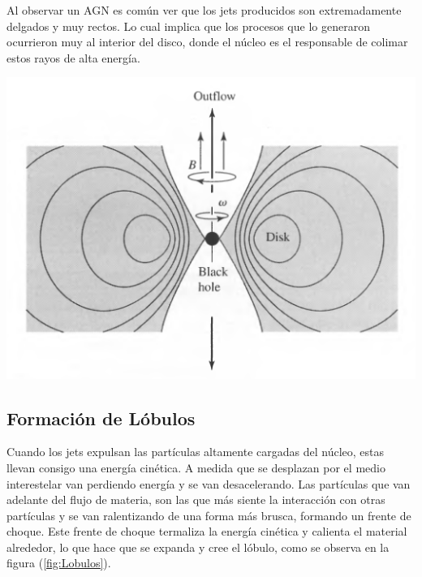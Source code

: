 Al observar un AGN es común ver que los jets producidos son extremadamente delgados y muy rectos. Lo cual implica  que los procesos que lo generaron ocurrieron muy al interior del disco, donde el núcleo es el responsable de colimar estos rayos de alta energía. %
%
\begin{center}
\includegraphics[scale=.5]{./figures/3_AGNs/Jets.png}
\label{fig:Modelo_interior_AGN}
\end{center}

	\subsection{Formación de Lóbulos}
	\label{subsec:Formation_lobules}

Cuando los jets expulsan las partículas altamente cargadas del núcleo, estas llevan consigo una energía cinética. A medida que se desplazan por el medio interestelar van perdiendo energía y se van desacelerando. Las partículas que van adelante del flujo de materia, son las que más siente la interacción con otras partículas y se van ralentizando de una forma más brusca, formando un frente de choque. Este frente de choque termaliza la energía cinética y calienta el material alrededor, lo que hace que se expanda y cree el lóbulo,
como se observa en la figura (\ref{fig:Lobulos}).

